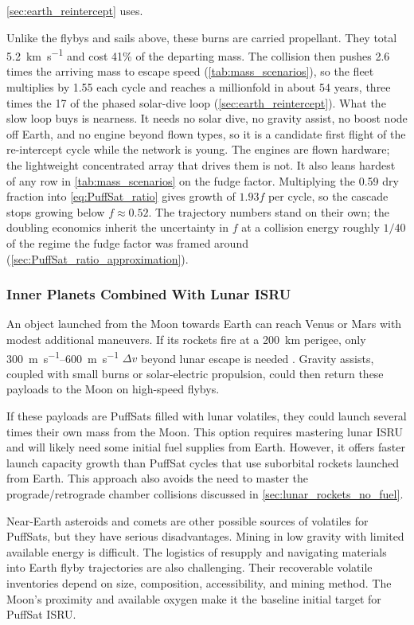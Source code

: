 \documentclass{article}
\newcommand{\deltav}{\Delta v}
\begin{document}
\autoref{sec:earth_reintercept} uses.

Unlike the flybys and sails above, these burns are carried propellant. They total \SI{5.2}{\kilo\meter\per\second} and cost 41\% of the departing mass. The collision then pushes 2.6 times the arriving mass to escape speed (\autoref{tab:mass_scenarios}), so the fleet multiplies by 1.55 each cycle and reaches a millionfold in about 54 years, three times the 17 of the phased solar-dive loop (\autoref{sec:earth_reintercept}). What the slow loop buys is nearness. It needs no solar dive, no gravity assist, no boost node off Earth, and no engine beyond flown types, so it is a candidate first flight of the re-intercept cycle while the network is young. The engines are flown hardware; the lightweight concentrated array that drives them is not. It also leans hardest of any row in \autoref{tab:mass_scenarios} on the fudge factor. Multiplying the 0.59 dry fraction into \autoref{eq:PuffSat_ratio} gives growth of $1.93f$ per cycle, so the cascade stops growing below $f \approx 0.52$. The trajectory numbers stand on their own; the doubling economics inherit the uncertainty in $f$ at a collision energy roughly $1/40$ of the regime the fudge factor was framed around (\autoref{sec:PuffSat_ratio_approximation}).

\subsubsection{Inner Planets Combined With Lunar ISRU}
An object launched from the Moon towards Earth can reach Venus or Mars with modest additional maneuvers.  If its rockets fire at a \SI{200}{\kilo\meter} perigee, only \SIrange{300}{600}{\meter\per\second} $\deltav$ beyond lunar escape is needed \cite{Katz_aim_is_all_you_need_2025}. Gravity assists, coupled with small burns or solar-electric propulsion, could then return these payloads to the Moon on high-speed flybys.

If these payloads are PuffSats filled with lunar volatiles, they could launch several times their own mass from the Moon. This option requires mastering lunar ISRU and will likely need some initial fuel supplies from Earth. However, it offers faster launch capacity growth than PuffSat cycles that use suborbital rockets launched from Earth. This approach also avoids the need to master the prograde/retrograde chamber collisions discussed in \autoref{sec:lunar_rockets_no_fuel}.

Near-Earth asteroids and comets are other possible sources of volatiles for PuffSats, but they have serious disadvantages. Mining in low gravity with limited available energy is difficult.  The logistics of resupply and navigating materials into Earth flyby trajectories are also challenging. Their recoverable volatile inventories depend on size, composition, accessibility, and mining method. The Moon's proximity and available oxygen make it the baseline initial target for PuffSat ISRU.
\end{document}
